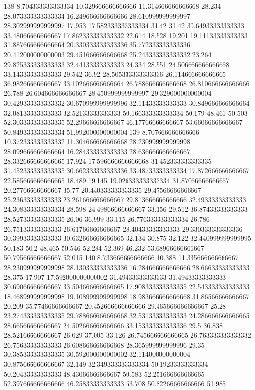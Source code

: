 138 8.704333333333334 10.329666666666666 11.314666666666668 28.234 28.073333333333334 16.249666666666666 28.610999999999997 28.302999999999997 17.953 17.582333333333334 31.42 31.42 30.64933333333333 33.48066666666667 17.862333333333332 22.614 18.528 19.201 19.11133333333333 31.887666666666664 20.330333333333336 35.772333333333336 20.412000000000003 29.451666666666668 25.243333333333332 23.264 29.825333333333333 32.44133333333333 24.334 28.551 24.506666666666668 33.14333333333333 29.542 36.92 28.505333333333336 26.114666666666665 36.98266666666667 33.102666666666664 26.788666666666668 26.810666666666666 26.788 26.604666666666667 28.450999999999997 29.329000000000004 30.429333333333332 30.670999999999996 32.11433333333333 30.849666666666664 32.08133333333333 32.52133333333333 50.166333333333334 50.179 48.461 50.503 52.303333333333335 52.29666666666667 46.17766666666667 53.66066666666667 50.849333333333334 51.992000000000004
139 8.707666666666666 10.372333333333332 11.304666666666668 28.230999999999998 28.099666666666664 16.284333333333333 28.636666666666667 28.332666666666665 17.924 17.596666666666668 31.452333333333335 31.452333333333335 30.662333333333336 33.48733333333334 17.872666666666667 22.585666666666665 18.489 19.145 19.026333333333334 31.87066666666667 20.27766666666667 35.77 20.440333333333335 29.47566666666667 25.23633333333333 23.261666666666667 29.813666666666666 32.49333333333333 24.308333333333334 28.598 24.49866666666667 33.156 29.512 36.87433333333333 28.527333333333335 26.06 36.999 33.115 26.776333333333334 26.786 26.75133333333333 26.61766666666667 28.40433333333333 29.330333333333336 30.39933333333333 30.632666666666665 32.134 30.875 32.122 32.440999999999995 50.183 50.2 48.465 50.546 52.284 52.369 46.232 53.68966666666667 50.79566666666667 52.015
140 8.733666666666666 10.388 11.335666666666667 28.230999999999998 28.130333333333336 16.284666666666666 28.66633333333333 28.375 17.907 17.592000000000002 31.49433333333333 31.49433333333333 30.69066666666667 33.504666666666665 17.908333333333335 22.543333333333333 18.468999999999998 19.108999999999998 18.983666666666668 31.86566666666667 20.209 35.77466666666667 20.452666666666666 29.465666666666667 25.28 23.274333333333335 29.788666666666668 32.53133333333333 24.286666666666665 28.66566666666667 24.502666666666666 33.153333333333336 29.5 36.838 28.52166666666667 26.029 37.005 33.126 26.745666666666665 26.763333333333332 26.75633333333333 26.608666666666668 28.365999999999996 29.35 30.385333333333335 30.592000000000002 32.114000000000004 30.875666666666667 32.149 32.349333333333334 50.19233333333334 50.20433333333333 48.43066666666667 50.583 52.251666666666665 52.397666666666666 46.25833333333333 53.708 50.82266666666666 51.985
